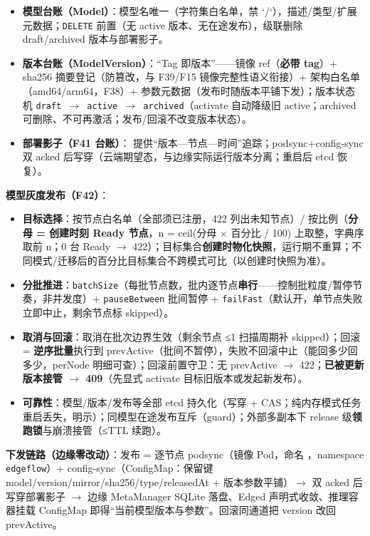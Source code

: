 \begin{itemize}
  \item \textbf{模型台账（Model）}：模型名唯一（字符集白名单，禁 `/`），描述/类型/扩展元数据；\texttt{DELETE} 前置（无 active 版本、无在途发布），级联删除 draft/archived 版本与部署影子。
  \item \textbf{版本台账（ModelVersion）}：“Tag 即版本”——镜像 ref（\textbf{必带 tag}）+ sha256 摘要登记（防篡改，与 F39/F15 镜像完整性语义衔接）+ 架构白名单（amd64/arm64，F38）+ 参数元数据（发布时随版本平铺下发）；版本状态机 \texttt{draft $\rightarrow$ active $\rightarrow$ archived}（activate 自动降级旧 active；archived 可删除、不可再激活；发布/回滚不改变版本状态）。
  \item \textbf{部署影子（F41 台账）}： 提供“版本—节点—时间”追踪；podsync+config-sync 双 acked 后写穿（云端期望态，与边缘实际运行版本分离；重启后 etcd 恢复）。
\end{itemize}

\textbf{模型灰度发布（F42）}：

\begin{itemize}
  \item \textbf{目标选择}：按节点白名单（全部须已注册，422 列出未知节点）/ 按比例（\textbf{分母 = 创建时刻 Ready 节点}，n = ceil(分母 × 百分比 / 100) 上取整，字典序取前 n；0 台 Ready $\rightarrow$ 422）；目标集合\textbf{创建时物化快照}，运行期不重算；不同模式/迁移后的百分比目标集合不跨模式可比（以创建时快照为准）。
  \item \textbf{分批推进}：\texttt{batchSize}（每批节点数，批内逐节点\textbf{串行}——控制批粒度/暂停节奏，非并发度）+ \texttt{pauseBetween} 批间暂停 + \texttt{failFast}（默认开，单节点失败立即中止，剩余节点标 skipped）。
  \item \textbf{取消与回滚}：取消在批次边界生效（剩余节点 ≤1 扫描周期补 skipped）；回滚 = \textbf{逆序批量}执行到 prevActive（批间不暂停），失败不回滚中止（能回多少回多少，perNode 明细可查）；回滚前置守卫：无 prevActive $\rightarrow$ 422；\textbf{已被更新版本接管 $\rightarrow$ 409}（先显式 activate 目标旧版本或发起新发布）。
  \item \textbf{可靠性}：模型/版本/发布等全部 etcd 持久化（写穿 + CAS；纯内存模式任务重启丢失，明示）；同模型在途发布互斥（guard）；外部多副本下 release 级\textbf{领跑锁}与崩溃接管（≤TTL 续跑）。
\end{itemize}

\textbf{下发链路（边缘零改动）}：发布 = 逐节点 podsync（镜像 Pod，命名 ，namespace \texttt{edgeflow}）+ config-sync（ConfigMap：保留键 model/version/mirror/sha256/type/releasedAt + 版本参数平铺）$\rightarrow$ 双 acked 后写穿部署影子 $\rightarrow$ 边缘 MetaManager SQLite 落盘、Edged 声明式收敛、推理容器挂载 ConfigMap 即得“当前模型版本与参数”。回滚同通道把 version 改回 prevActive。

